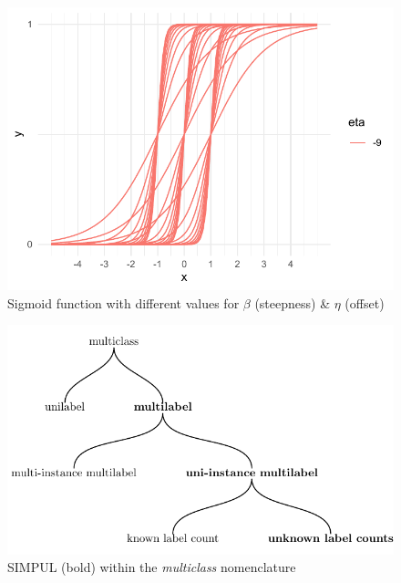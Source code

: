 \begin{figure}[htbp]
\centering
\includegraphics[width=.9\linewidth]{./images/sigmoid.pdf}
\caption{\label{fig:sigmoid}
Sigmoid function with different values for $\beta$ (steepness) \& $\eta$ (offset)}
\end{figure}


\begin{figure}[t]
\centering
\includegraphics[width=.9\linewidth]{./tree/Tree.pdf}
\caption{\label{fig:tree}
SIMPUL (bold) within the \emph{multiclass} nomenclature
}
\end{figure}

